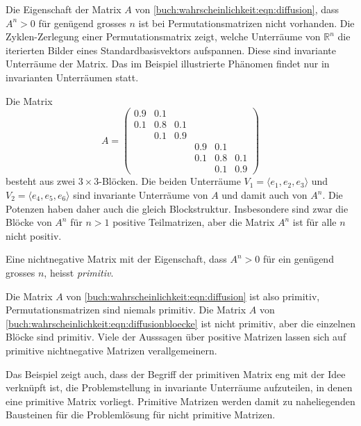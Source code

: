 Die Eigenschaft der Matrix $A$ von
\eqref{buch:wahrscheinlichkeit:eqn:diffusion}, dass $A^n>0$
für genügend grosses $n$ ist bei Permutationsmatrizen nicht
vorhanden.
Die Zyklen-Zerlegung einer Permutationsmatrix zeigt, welche
Unterräume von $\mathbb{R}^n$ die iterierten Bilder eines
Standardbasisvektors aufspannen.
Diese sind invariante Unterräume der Matrix.
Das im Beispiel illustrierte Phänomen findet nur in invarianten
Unterräumen statt.

\begin{beispiel}
Die Matrix
\begin{equation}
A=\begin{pmatrix}
0.9&0.1&   &   &   &   \\
0.1&0.8&0.1&   &   &   \\
   &0.1&0.9&   &   &   \\
   &   &   &0.9&0.1&   \\
   &   &   &0.1&0.8&0.1\\
   &   &   &   &0.1&0.9
\end{pmatrix}
\label{buch:wahrscheinlichkeit:eqn:diffusionbloecke}
\end{equation}
besteht aus zwei $3\times 3$-Blöcken.
Die beiden Unterräume $V_1=\langle e_1,e_2,e_3\rangle$
und $V_2=\langle e_4,e_5,e_6\rangle$ sind invariante
Unterräume von $A$ und damit auch von $A^n$.
Die Potenzen haben daher auch die gleich Blockstruktur.
Insbesondere sind zwar die Blöcke von $A^n$ für $n>1$ positive
Teilmatrizen, aber die Matrix $A^n$ ist für alle $n$ nicht positiv.
\end{beispiel}

\begin{definition}
Eine nichtnegative Matrix mit der Eigenschaft, dass $A^n>0$ für
ein genügend grosses $n$, heisst {\em primitiv}.
%
\end{definition}

Die Matrix $A$ von \eqref{buch:wahrscheinlichkeit:eqn:diffusion}
ist also primitiv, Permutationsmatrizen sind niemals primitiv.
Die Matrix $A$ von \eqref{buch:wahrscheinlichkeit:eqn:diffusionbloecke}
ist nicht primitiv, aber die einzelnen Blöcke sind primitiv.
Viele der Ausssagen über positive Matrizen lassen sich auf primitive
nichtnegative Matrizen verallgemeinern.

Das Beispiel zeigt auch, dass der Begriff der primitiven Matrix 
eng mit der Idee verknüpft ist, die Problemstellung in invariante
Unterräume aufzuteilen, in denen eine primitive Matrix vorliegt.
Primitive Matrizen werden damit zu naheliegenden Bausteinen für
die Problemlösung für nicht primitive Matrizen.

